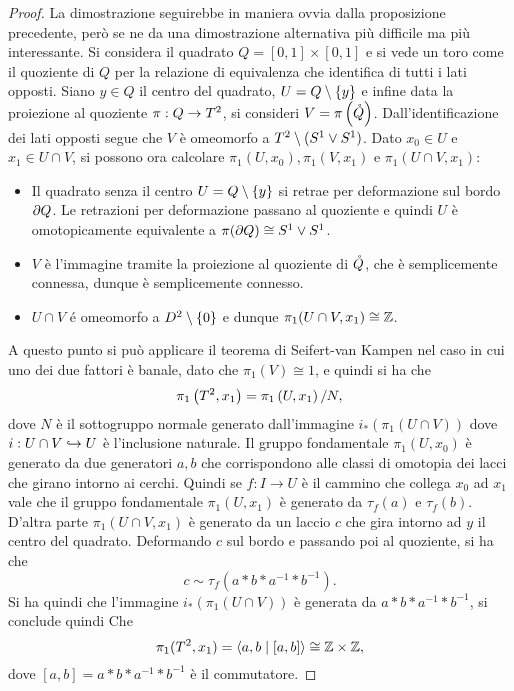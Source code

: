 \documentclass[]{article}
\begin{document}
\begin{proof} \nl
    La dimostrazione seguirebbe in maniera ovvia dalla proposizione precedente, per\`o se ne da una dimostrazione
    alternativa pi\`u difficile ma pi\`u interessante. \nl
    Si considera il quadrato $Q = [0,1] \times [0,1]$ e si vede un toro come il quoziente di $Q$ per la relazione di equivalenza
    che identifica di tutti i lati opposti. \nl
    Siano $y \in Q$ il centro del quadrato, $U = Q \setminus \left\{ y \right\}$ e infine data la proiezione al quoziente
    $\pi: Q \to T^{2}$, si consideri $V = \pi\left(\mathring{Q}\right)$. \nl
    Dall'identificazione dei lati opposti segue che $V$ \`e omeomorfo a $T^{2} \setminus (S^{1} \vee S^{1})$. \nl
    Dato $x_0 \in U$ e $x_1 \in U \cap V$, si possono ora calcolare $\pi_1(U, x_0), \pi_1(V, x_1)$ e $\pi_1(U \cap V, x_1)$: \nl
    \begin{itemize}
        \item Il quadrato senza il centro $U = Q \setminus \left\{ y \right\}$ si retrae per deformazione sul bordo $\partial Q$. \nl
        Le retrazioni per deformazione passano al quoziente e quindi $U$ \`e omotopicamente equivalente a $\pi(\partial Q) \cong S^{1} \vee S^{1}$. \nl
        \item $V$ \`e l'immagine tramite la proiezione al quoziente di $\mathring{Q}$, che \`e semplicemente connessa, dunque \`e semplicemente connesso. \nl
        \item $U \cap V$ \'e omeomorfo a $D^{2} \setminus \left\{ 0 \right\}$ e dunque $\pi_1(U \cap V, x_1) \cong \mathbb{Z}$.
    \end{itemize}
    A questo punto si pu\`o applicare il teorema di Seifert-van Kampen nel caso in cui uno dei due fattori \`e banale,
    dato che $\pi_1(V) \cong {1}$, e quindi si ha che
    \[
        \pi_1\left(T^{2}, x_1\right) = \pi_1\left(U,x_1\right) / N,
    \]
    dove $N$ \`e il sottogruppo normale generato dall'immagine $i_*(\pi_1(U \cap V))$ dove 
    $i: U \cap V \hookrightarrow U$ \`e l'inclusione naturale. \nl
    Il gruppo fondamentale $\pi_1(U, x_0)$ \`e generato da due generatori $a, b$ che corrispondono alle classi di omotopia dei lacci che girano intorno ai cerchi. \nl
    Quindi se $f: I \to U$ \`e il cammino che collega $x_0$ ad $x_1$ vale che il gruppo fondamentale $\pi_1(U, x_1)$ \`e generato
    da $\tau_f(a)$ e $\tau_f(b)$. \nl
    D'altra parte $\pi_1(U \cap V, x_1)$ \`e generato da un laccio $c$ che gira intorno ad $y$ il centro del quadrato. \nl
    Deformando $c$ sul bordo e passando poi al quoziente, si ha che
    \[
        c \sim \tau_f(a*b*a^{-1}*b^{-1}).
    \]
    Si ha quindi che l'immagine $i_*(\pi_1(U \cap V))$ \`e generata da $a*b*a^{-1}*b^{-1}$, si conclude quindi Che
    \[
        \pi_1(T^{2}, x_1) = \left< a, b \mid [a,b]\right> \cong \mathbb{Z} \times \mathbb{Z},
    \]
    dove $[a,b] = a*b*a^{-1}*b^{-1}$ \`e il commutatore.
\end{proof}
\end{document}
